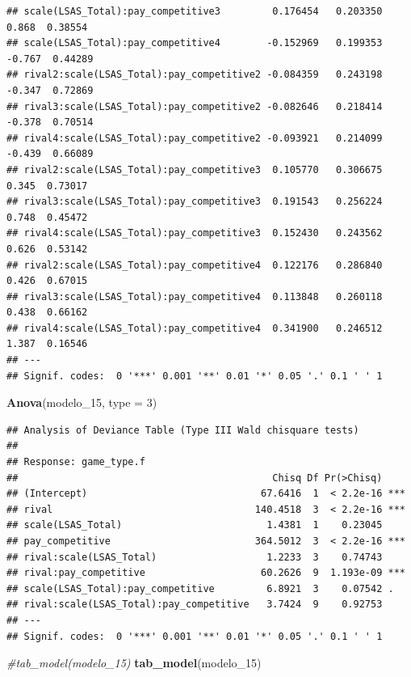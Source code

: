 \documentclass[
]{article}
\newenvironment{Shaded}{\begin{snugshade}}{\end{snugshade}}
\newcommand{\AttributeTok}[1]{\textcolor[rgb]{0.13,0.29,0.53}{#1}}
\newcommand{\CommentTok}[1]{\textcolor[rgb]{0.56,0.35,0.01}{\textit{#1}}}
\newcommand{\DecValTok}[1]{\textcolor[rgb]{0.00,0.00,0.81}{#1}}
\newcommand{\FunctionTok}[1]{\textcolor[rgb]{0.13,0.29,0.53}{\textbf{#1}}}
\newcommand{\NormalTok}[1]{#1}
\begin{document}
\begin{verbatim}
## scale(LSAS_Total):pay_competitive3         0.176454   0.203350   0.868  0.38554    
## scale(LSAS_Total):pay_competitive4        -0.152969   0.199353  -0.767  0.44289    
## rival2:scale(LSAS_Total):pay_competitive2 -0.084359   0.243198  -0.347  0.72869    
## rival3:scale(LSAS_Total):pay_competitive2 -0.082646   0.218414  -0.378  0.70514    
## rival4:scale(LSAS_Total):pay_competitive2 -0.093921   0.214099  -0.439  0.66089    
## rival2:scale(LSAS_Total):pay_competitive3  0.105770   0.306675   0.345  0.73017    
## rival3:scale(LSAS_Total):pay_competitive3  0.191543   0.256224   0.748  0.45472    
## rival4:scale(LSAS_Total):pay_competitive3  0.152430   0.243562   0.626  0.53142    
## rival2:scale(LSAS_Total):pay_competitive4  0.122176   0.286840   0.426  0.67015    
## rival3:scale(LSAS_Total):pay_competitive4  0.113848   0.260118   0.438  0.66162    
## rival4:scale(LSAS_Total):pay_competitive4  0.341900   0.246512   1.387  0.16546    
## ---
## Signif. codes:  0 '***' 0.001 '**' 0.01 '*' 0.05 '.' 0.1 ' ' 1
\end{verbatim}

\begin{Shaded}
\begin{Highlighting}[]
\FunctionTok{Anova}\NormalTok{(modelo\_15, }\AttributeTok{type =} \DecValTok{3}\NormalTok{)}
\end{Highlighting}
\end{Shaded}

\begin{verbatim}
## Analysis of Deviance Table (Type III Wald chisquare tests)
## 
## Response: game_type.f
##                                            Chisq Df Pr(>Chisq)    
## (Intercept)                              67.6416  1  < 2.2e-16 ***
## rival                                   140.4518  3  < 2.2e-16 ***
## scale(LSAS_Total)                         1.4381  1    0.23045    
## pay_competitive                         364.5012  3  < 2.2e-16 ***
## rival:scale(LSAS_Total)                   1.2233  3    0.74743    
## rival:pay_competitive                    60.2626  9  1.193e-09 ***
## scale(LSAS_Total):pay_competitive         6.8921  3    0.07542 .  
## rival:scale(LSAS_Total):pay_competitive   3.7424  9    0.92753    
## ---
## Signif. codes:  0 '***' 0.001 '**' 0.01 '*' 0.05 '.' 0.1 ' ' 1
\end{verbatim}

\begin{Shaded}
\begin{Highlighting}[]
\CommentTok{\#tab\_model(modelo\_15)}
\FunctionTok{tab\_model}\NormalTok{(modelo\_15)}
\end{Highlighting}
\end{Shaded}
\end{document}
